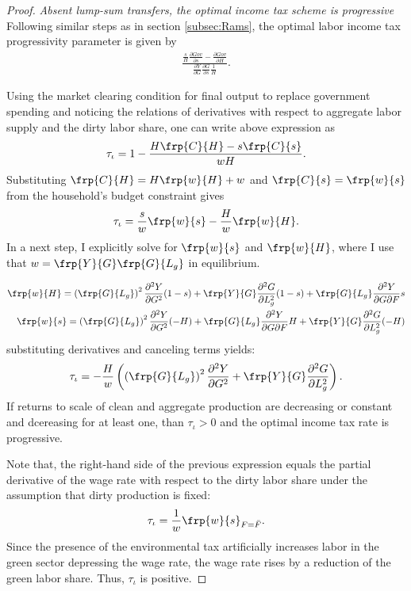 \begin{proof}\textit{Absent lump-sum transfers, the optimal income tax scheme is progressive}
Following similar steps as in section \ref{subsec:Rams}, the optimal labor income tax progressivity parameter is given by
\begin{align}
\frac{\frac{s}{H}\frac{\partial Gov}{\partial s}- \frac{\partial Gov}{\partial H}}{\frac{\partial Y}{\partial G}\frac{\partial G}{\partial s}\frac{1}{H}}.
\end{align}

	Using the market clearing condition for final output to replace government spending and noticing the relations of derivatives with respect to aggregate labor supply and the dirty labor share, one can write above expression as
	\begin{align}
	\tau_{\iota}=1-\frac{H\frp{C}{H}-s\frp{C}{s}}{wH}.
	\end{align}
	Substituting $\frp{C}{H}=H\frp{w}{H}+w$ and $\frp{C}{s}=\frp{w}{s}$ from the household's budget constraint gives
	\begin{align}
	\tau_{\iota}=\frac{s}{w}\frp{w}{s}-\frac{H}{w}\frp{w}{H}.
	\end{align}
In a next step, I explicitly solve for $\frp{w}{s}$ and $\frp{w}{H}$, where I use that $w=\frp{Y}{G}\frp{G}{L_g}$ in equilibrium.

\begin{align}
\frp{w}{H}=\left(\frp{G}{L_g}\right)^2\frac{\partial^2Y}{\partial G^2}(1-s)+\frp{Y}{G}\frac{\partial ^2G}{\partial L_g^2}(1-s)+\frp{G}{L_g}\frac{\partial^2 Y}{\partial G \partial F}s\\
\frp{w}{s}= \left(\frp{G}{L_g}\right)^2\frac{\partial ^2Y}{\partial G^2}(-H)+\frp{G}{L_g}\frac{\partial ^2Y}{\partial G \partial F}H+\frp{Y}{G}\frac{\partial ^2 G}{\partial L_g^2}(-H)
\end{align}
substituting derivatives and canceling terms yields:
\begin{align}
\tau_\iota= -\frac{H}{w}\left(\left(\frp{G}{L_g}\right)^2\frac{\partial ^2Y}{\partial G^2}+\frp{Y}{G}\frac{\partial ^2G}{\partial L_g ^2}\right).
\end{align}
If returns to scale of clean and aggregate production are decreasing or constant and dcereasing for at least one, than $\tau_\iota >0$ and the optimal income tax rate is progressive. 

Note that, the right-hand side of the previous expression equals the partial derivative of the wage rate with respect to the dirty labor share under the assumption that dirty production is fixed:
\begin{align}
\tau_\iota =\frac{1}{w}\frp{w}{s}_{F=\bar{F}}.
\end{align}
Since the presence of the environmental tax artificially increases labor in the green sector depressing the wage rate, the wage rate rises by a reduction of the green labor share. Thus, $\tau_\iota$ is positive. 
	\end{proof}

